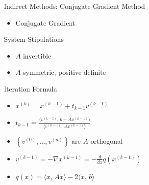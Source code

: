 \documentclass[9pt, serif]{beamer}
\newlength{\wideitemsep}
\let\olditem\item
\renewcommand{\item}{\setlength{\itemsep}{\wideitemsep}\olditem}
\newcommand{\bi}{\begin{itemize}}
\newcommand{\ei}{\end{itemize}}
\begin{document}
\begin{frame}{Indirect Methods: Conjugate Gradient}
    Method
    \bi
        \item Conjugate Gradient
    \ei
    System Stipulations
    \bi
        \item $A$ invertible
        \item $A$ symmetric, positive definite
    \ei
    Iteration Formula
    \bi
        \item $x^{(k)} = x^{(k-1)}+t_{k-1}v^{(k-1)}$
        \item $t_{k-1} = \frac{\langle v^{(k-1)},\, b - Ax^{(k-1)}\rangle}{\langle v^{(k-1)},\, Av^{(k-1)} \rangle}$
        \item $\left\{v^{(0)},\ldots,v^{(n)}\right\}$ are $A$-orthogonal
        \item $v^{(k-1)} = -\nabla x^{(k-1)} = -\frac{d}{dx} q(x^{(k-1)})$
        \item $q(x) = \langle x,\, Ax \rangle - 2 \langle x,\, b \rangle$
    \ei
\end{frame}
\end{document}
